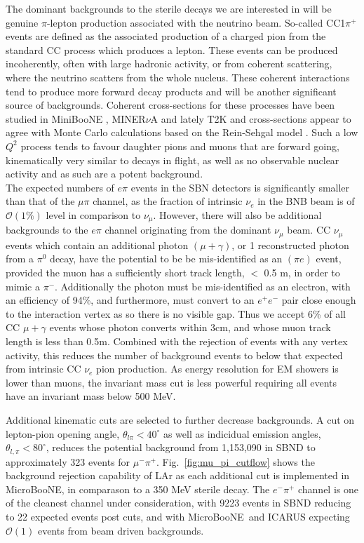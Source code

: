 \documentclass[11pt, a4paper]{article}
\newcommand{\reffig}[1]{Fig.~\ref{#1}}
\def\muboone{MicroBooNE}
\def\minerva{MINER$\nu$A}
\begin{document}
The dominant backgrounds to the sterile decays we are interested in will be
genuine $\pi$-lepton production associated with the neutrino beam. So-called
CC1$\pi^+$ events are defined as the associated production of a charged pion
from the standard CC process which produces a lepton. These events can be
produced incoherently, often with large hadronic activity, or from coherent
scattering, where the neutrino scatters from the whole nucleus. These coherent
interactions tend to produce more forward decay products and will be another
significant source of backgrounds. Coherent cross-sections for these processes
have been studied in MiniBooNE \cite{Wascko:2006tx}, \minerva
\cite{Eberly:2014mra} and lately T2K and cross-sections appear to agree with
Monte Carlo calculations based on the Rein-Sehgal model \cite{Rein:2006di,
Rein:1982pf}.  Such a low $Q^2$ process tends to favour daughter pions and
muons that are forward going, kinematically very similar to decays in flight,
as well as no observable nuclear activity and as such are a potent
background.\\ 

The expected numbers of $e \pi$ events in the SBN detectors is significantly
smaller than that of the $\mu \pi$ channel, as the fraction of intrinsic
$\nu_e$ in the BNB beam is of $\mathcal{O}(1\%)$ level in comparison to
$\nu_\mu$. However, there will also be additional backgrounds to the $e \pi$
channel originating from the dominant $\nu_\mu$ beam. CC $\nu_\mu$ events which
contain an additional photon $(\mu+\gamma)$, or 1 reconstructed photon from a
$\pi^0$ decay, have the potential to be be mis-identified as an $(\pi e)$
event, provided the muon has a sufficiently short track length, $<$ 0.5 m, in
order to mimic a $\pi^-$. Additionally the photon must be mis-identified as an
electron, with an efficiency of 94\%, and furthermore, must convert to an
$e^+e^-$ pair close enough to the interaction vertex as so there is no visible
gap. Thus we accept 6\% of all CC $\mu+\gamma$ events whose photon converts
within 3cm, and whose muon track length is less than 0.5m. Combined with the
rejection of events with any vertex activity, this reduces the number of
background events to below that expected from intrinsic CC $\nu_e$ pion
production. As energy resolution for EM showers is lower than muons, the
invariant mass cut is less powerful requiring all events have an invariant mass
below 500 MeV. 

Additional kinematic cuts are selected to further decrease backgrounds. A cut
on lepton-pion opening angle, $\theta_{l \pi} < 40^\circ$ as well as indicidual
emission angles, $\theta_{l,\pi} < 80^\circ$, reduces the potential background
from 1,153,090 in SBND to approximately 323 events for $\mu^- \pi^+$.
\reffig{fig:mu_pi_cutflow} shows the background rejection capability of LAr as
each additional cut is implemented in \muboone, in comparason to a 350 MeV
sterile decay. The $e^- \pi^+$ channel is one of the cleanest channel under
consideration, with 9223 events in SBND reducing to 22 expected events post
cuts, and with \muboone\ and ICARUS expecting $\mathcal{O}(1)$ events from
beam driven backgrounds.
\end{document}
